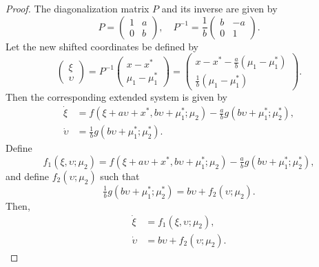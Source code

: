 \documentclass[12pt]{article}
\begin{document}
\begin{proof}
    The diagonalization matrix $P$ and its inverse are given by
    \[P=\begin{pmatrix}
         1 & a \\
         0 & b
        \end{pmatrix}, \quad
    P^{-1}=\frac{1}{b}\begin{pmatrix}
         b & -a \\
         0 & 1
        \end{pmatrix}.
    \]
    Let the new shifted coordinates be defined by
    \begin{equation*}
        \begin{pmatrix}
            \xi \\
            \upsilon
        \end{pmatrix} = P^{-1}
        \begin{pmatrix}
            x-x^{*} \\
            \mu_{1} - \mu_{1}^{*}
        \end{pmatrix} =
        \begin{pmatrix}
            x -x^{*} - \frac{a}{b}(\mu_{1}-\mu_{1}^{*}) \\
            \frac{1}{b}(\mu_{1}-\mu_{1}^{*})
        \end{pmatrix}.
    \end{equation*}
    Then the corresponding extended system is given by
    \begin{equation*}
        \begin{aligned}
            \dot \xi &= f(\xi+a\upsilon+ x^{*}, b\upsilon + \mu_{1}^{*};\mu_{2}) - \tfrac{a}{b}g(b\upsilon + \mu_{1}^{*};\mu_{2}^{*}), \\
            \dot \upsilon & = \tfrac{1}{b}g(b\upsilon+\mu_{1}^{*};\mu_{2}^{*}).
        \end{aligned}
    \end{equation*}
    Define
    \begin{equation}
        f_{1}(\xi,\upsilon;\mu_{2})=f(\xi+a\upsilon+ x^{*}, b\upsilon + \mu_{1}^{*};\mu_{2}) - \tfrac{a}{b}g(b\upsilon + \mu_{1}^{*};\mu_{2}^{*}),
        \label{equ:1DCase:Proposition1:Proof:f1}
    \end{equation}
    and define $f_{2}(\upsilon; \mu_{2})$ such that
    \begin{equation*}
        \tfrac{1}{b}g(b\upsilon+\mu_{1}^{*};\mu_{2}^{*}) = b \upsilon + f_{2}(\upsilon;\mu_{2}).
    \end{equation*}
    Then,
    \begin{equation}
        \begin{aligned}
            \dot \xi &= f_{1}(\xi ,\upsilon;\mu_{2}), \\
            \dot \upsilon &= b \upsilon + f_{2}(\upsilon; \mu_{2}).
        \end{aligned}
        \label{equ:1DCase:Proposition1:Proof:Coordinates}
    \end{equation}


\end{proof}
\end{document}
